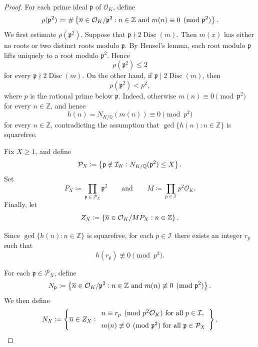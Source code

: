 \documentclass[10pt,a4paper]{amsart}
\begin{document}
\begin{proof}
    For each prime ideal $\mathfrak{p}$ of $\mathcal{O}_K$, define
    \[
        \rho(\mathfrak{p}^2) \coloneqq \#\left\{\overline{n}\in\mathcal{O}_K/\mathfrak{p}^2
        \vcentcolon n\in\mathbb{Z} \text{ and } m(n)\equiv 0\pmod{\mathfrak{p}^2}\right\}.
    \]
    We first estimate $\rho(\mathfrak{p}^2)$. Suppose that
    $\mathfrak{p}\nmid 2\operatorname{Disc}(m)$. Then $m(x)$ has either no roots or two distinct roots modulo $\mathfrak{p}$. By Hensel's lemma, each root modulo $\mathfrak{p}$ lifts uniquely to a root modulo $\mathfrak{p}^2$. Hence
    \[
        \rho(\mathfrak{p}^2)\leq 2 
    \]
    for every $\mathfrak{p}\nmid 2\operatorname{Disc}(m)$. On the other hand, if
    $\mathfrak{p}\mid 2\operatorname{Disc}(m)$, then
    \[
        \rho(\mathfrak{p}^2)<p^2,
    \]
    where $p$ is the rational prime below $\mathfrak{p}$. Indeed, otherwise $m(n)\equiv0\pmod{\mathfrak{p}^2}$ for every $n\in\mathbb{Z}$, and hence
    \[
        h(n) = N_{K/\mathbb{Q}}(m(n)) \equiv0\pmod{p^2}
    \]
    for every $n\in\mathbb{Z}$, contradicting the assumption that $\gcd\{h(n):n\in\mathbb{Z}\}$ is squarefree.
    
    Fix $X\geq1$, and define
    \[
        \mathcal{P}_X \coloneqq \left\{\mathfrak{p}\notin\mathcal{I}_K \vcentcolon N_{K/\mathbb{Q}}(\mathfrak{p}^2)\leq X \right\}.
    \]
    Set
    \[ 
        P_X\coloneqq \prod_{\mathfrak{p}\in\mathcal{P}_X}\mathfrak{p}^2
        \qquad\text{and}\qquad M\coloneqq \prod_{p\in\mathcal{I}}p^2\mathcal{O}_K.
    \]
    Finally, let
    \[
        Z_X \coloneqq \left\{\overline{n}\in\mathcal{O}_K/MP_X \vcentcolon n\in\mathbb{Z}\right\}.
    \]
    
    Since $\gcd\{h(n):n\in\mathbb{Z}\}$ is squarefree, for each $p\in\mathcal{I}$ there exists an integer $r_p$ such that
    \[
        h(r_p)\not\equiv0\pmod{p^2}.
    \]
    
    For each $\mathfrak{p}\in\mathcal{P}_X$, define
    \[
        N_{\mathfrak{p}} \coloneqq \left\{\overline{n}\in\mathcal{O}_K/\mathfrak{p}^2 \vcentcolon n\in\mathbb{Z} \text{ and } m(n)\not\equiv0\pmod{\mathfrak{p}^2}\right\}.
    \]
    We then define
    \[
        N_X \coloneqq \left\{\overline{n}\in Z_X \vcentcolon
        \begin{array}{l}
            n\equiv r_p\pmod{p^2\mathcal{O}_K}
            \text{ for all }p\in\mathcal{I},\\[2mm]
            m(n)\not\equiv0\pmod{\mathfrak{p}^2}
            \text{ for all }\mathfrak{p}\in\mathcal{P}_X
        \end{array}
        \right\}.
    \]
    

\end{proof}
\end{document}
